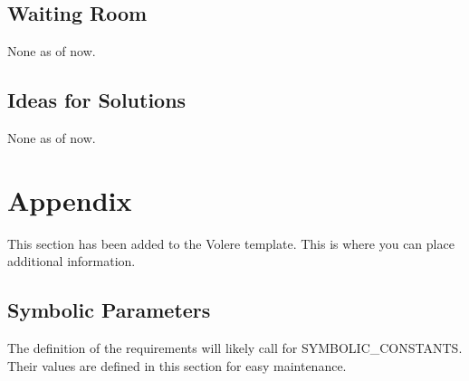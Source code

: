 \documentclass[12pt, titlepage]{article}
\begin{document}
\subsection{Waiting Room}
None as of now.


\subsection{Ideas for Solutions}
None as of now.

\newpage





\newpage

\section{Appendix}

This section has been added to the Volere template.  This is where you can place
additional information.

\subsection{Symbolic Parameters}

The definition of the requirements will likely call for SYMBOLIC\_CONSTANTS.
Their values are defined in this section for easy maintenance.
\end{document}
